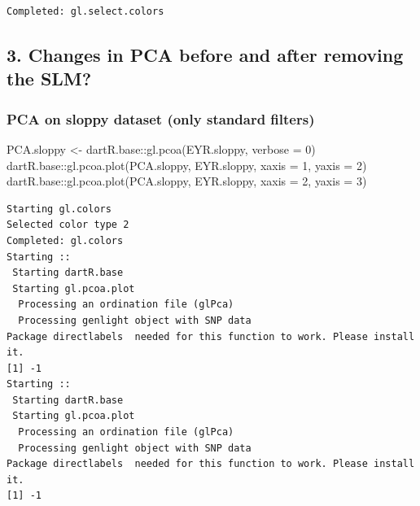 \documentclass[
  letterpaper,
  DIV=11,
  numbers=noendperiod]{scrreprt}
\newenvironment{Shaded}{\begin{snugshade}}{\end{snugshade}}
\newcommand{\AttributeTok}[1]{\textcolor[rgb]{0.49,0.56,0.16}{#1}}
\newcommand{\DecValTok}[1]{\textcolor[rgb]{0.25,0.63,0.44}{#1}}
\newcommand{\FunctionTok}[1]{\textcolor[rgb]{0.02,0.16,0.49}{#1}}
\newcommand{\NormalTok}[1]{\textcolor[rgb]{0.00,0.44,0.13}{#1}}
\newcommand{\OtherTok}[1]{\textcolor[rgb]{0.00,0.44,0.13}{#1}}
\newcommand{\SpecialCharTok}[1]{\textcolor[rgb]{0.25,0.44,0.63}{#1}}
\begin{document}
\begin{verbatim}
Completed: gl.select.colors 
\end{verbatim}

\hypertarget{changes-in-pca-before-and-after-removing-the-slm-1}{%
\subsection*{3. Changes in PCA before and after removing the
SLM?}\label{changes-in-pca-before-and-after-removing-the-slm-1}}

\hypertarget{pca-on-sloppy-dataset-only-standard-filters}{%
\subsubsection*{PCA on sloppy dataset (only standard
filters)}\label{pca-on-sloppy-dataset-only-standard-filters}}

\begin{Shaded}
\begin{Highlighting}[]
\NormalTok{PCA.sloppy }\OtherTok{\textless{}{-}}\NormalTok{ dartR.base}\SpecialCharTok{::}\FunctionTok{gl.pcoa}\NormalTok{(EYR.sloppy, }\AttributeTok{verbose =} \DecValTok{0}\NormalTok{)}
\NormalTok{dartR.base}\SpecialCharTok{::}\FunctionTok{gl.pcoa.plot}\NormalTok{(PCA.sloppy, EYR.sloppy, }\AttributeTok{xaxis =} \DecValTok{1}\NormalTok{, }\AttributeTok{yaxis =} \DecValTok{2}\NormalTok{)}
\NormalTok{dartR.base}\SpecialCharTok{::}\FunctionTok{gl.pcoa.plot}\NormalTok{(PCA.sloppy, EYR.sloppy, }\AttributeTok{xaxis =} \DecValTok{2}\NormalTok{, }\AttributeTok{yaxis =} \DecValTok{3}\NormalTok{)}
\end{Highlighting}
\end{Shaded}

\begin{verbatim}
Starting gl.colors 
Selected color type 2 
Completed: gl.colors 
Starting :: 
 Starting dartR.base 
 Starting gl.pcoa.plot 
  Processing an ordination file (glPca)
  Processing genlight object with SNP data
Package directlabels  needed for this function to work. Please install it.
[1] -1
Starting :: 
 Starting dartR.base 
 Starting gl.pcoa.plot 
  Processing an ordination file (glPca)
  Processing genlight object with SNP data
Package directlabels  needed for this function to work. Please install it.
[1] -1
\end{verbatim}
\end{document}
